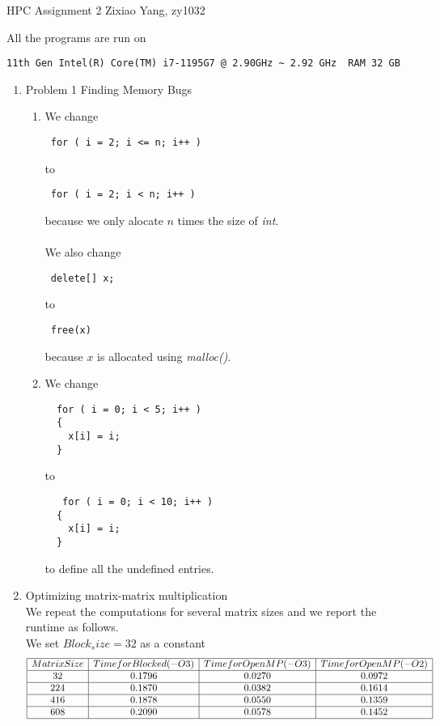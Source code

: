 \documentclass{article}
\begin{document}
{ \centerline{\large HPC Assignment 2 \quad Zixiao Yang, zy1032}}
\vskip0.25cm
\vskip0.25cm

All the programs are run on \begin{verbatim}11th Gen Intel(R) Core(TM) i7-1195G7 @ 2.90GHz ~ 2.92 GHz  RAM 32 GB \end{verbatim}
\begin{enumerate}
\item Problem 1 Finding Memory Bugs
\begin{enumerate}
\item We change \begin{verbatim} for ( i = 2; i <= n; i++ ) \end{verbatim} to \begin{verbatim} for ( i = 2; i < n; i++ ) \end{verbatim}
because we only alocate $n$ times the size of \emph{int}.
\\ \\
We also change \begin{verbatim} delete[] x; \end{verbatim} to \begin{verbatim} free(x) \end{verbatim}
because $x$ is allocated using \emph{malloc()}.
\item 
We change \begin{verbatim}  for ( i = 0; i < 5; i++ )
  {
    x[i] = i;
  } \end{verbatim} to \begin{verbatim}   for ( i = 0; i < 10; i++ )
  {
    x[i] = i;
  } \end{verbatim}
to define all the undefined entries.
\end{enumerate}
\item Optimizing matrix-matrix multiplication
\\
We repeat the computations for several matrix sizes and we report the runtime as follows.
\\
We set $Block_size=32$ as a constant
\[
\begin{array}{|c|c|c|c|c|}
\hline
 Matrix Size & Time for Blocked (-O3 )& Time for OpenMP (-O3) &Time for OpenMP(-O2)\\
\hline
32 & 0.1796 & 0.0270  & 0.0972\\ \hline
224 & 0.1870  & 0.0382&0.1614\\ \hline
416 & 0.1878 &0.0550 &0.1359\\ \hline
608 & 0.2090 & 0.0578 &0.1452\\ \hline

\end{array}\]
\end{enumerate}
\end{document}
